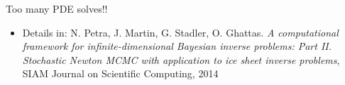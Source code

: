 \documentclass[10pt,final,xcolor=dvipsnames]{beamer}
\begin{document}
\begin{frame}
	\begin{center}
	{\huge Too many PDE solves!!}
	\end{center}
	\vspace{0.05in}
	
	\begin{itemize}
		\item [] \scriptsize{Details in: N. Petra, J. Martin, G. Stadler,
			O. Ghattas. {\em A computational framework for
				infinite-dimensional Bayesian inverse problems: Part
				II. Stochastic Newton MCMC with application to ice sheet inverse
				problems}, SIAM Journal on Scientific Computing, 2014}
	\end{itemize}
	
\end{frame}
\end{document}

